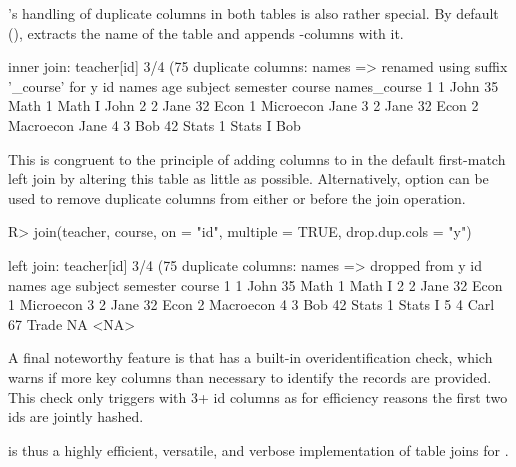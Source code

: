 \documentclass[nojss]{jss} %
\newcommand{\fct}[1]{\code{#1()}}
\begin{document}
\newpage
\fct{join}'s handling of duplicate columns in both tables is also rather special. By default (), \fct{join} extracts the name of the  table and appends -columns with it. %
%
\begin{Schunk}
\begin{Soutput}
inner join: teacher[id] 3/4 (75%) <1:1.33> course[id] 4/5 (80%)
duplicate columns: names => renamed using suffix '_course' for y
  id names age subject semester    course names_course
1  1  John  35    Math        1    Math I         John
2  2  Jane  32    Econ        1 Microecon         Jane
3  2  Jane  32    Econ        2 Macroecon         Jane
4  3   Bob  42   Stats        1   Stats I          Bob
\end{Soutput}
\end{Schunk}
%
This is congruent to the principle of adding columns to  in the default first-match left join by altering this table as little as possible. Alternatively, option  can be used to remove duplicate columns from either  or  before the join operation.
%
\begin{Schunk}
\begin{Sinput}
R> join(teacher, course, on = "id", multiple = TRUE, drop.dup.cols = "y")
\end{Sinput}
\begin{Soutput}
left join: teacher[id] 3/4 (75%) <1:1.33> course[id] 4/5 (80%)
duplicate columns: names => dropped from y
  id names age subject semester    course
1  1  John  35    Math        1    Math I
2  2  Jane  32    Econ        1 Microecon
3  2  Jane  32    Econ        2 Macroecon
4  3   Bob  42   Stats        1   Stats I
5  4  Carl  67   Trade       NA      <NA>
\end{Soutput}
\end{Schunk}
%
A final noteworthy feature is that \fct{fmatch} has a built-in overidentification check, which warns if more key columns than necessary to identify the records are provided. This check only triggers with 3+ id columns as for efficiency reasons the first two ids are jointly hashed.

\fct{join} is thus a highly efficient, versatile, and verbose implementation of table joins for .
%
\end{document}
